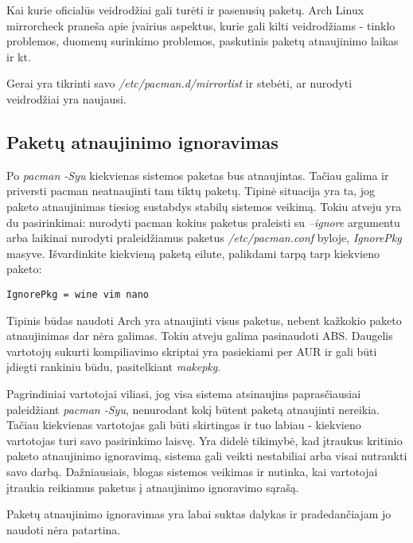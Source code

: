       Kai kurie oficialūs veidrodžiai gali turėti ir pasenusių
      paketų. Arch Linux mirrorcheck praneša apie įvairius aspektus,
      kurie gali kilti veidrodžiams - tinklo problemos, duomenų
      surinkimo problemos, paskutinis paketų atnaujinimo laikas ir kt.

      Gerai yra tikrinti savo \textsl{/etc/pacman.d/mirrorlist} ir
      stebėti, ar nurodyti veidrodžiai yra naujausi. 

    \subsection{Paketų atnaujinimo ignoravimas}

      Po \textsl{pacman -Syu} kiekvienas sistemos paketas bus
      atnaujintas. Tačiau galima ir priversti pacman neatnaujinti tam
      tiktų paketų. Tipinė situacija yra ta, jog paketo atnaujinimas
      tiesiog sustabdys stabilų sistemos veikimą. Tokiu atveju yra du
      pasirinkimai: nurodyti pacman kokius paketus praleisti su
      \textsl{--ignore} argumentu arba laikinai nurodyti praleidžiamus
      paketus \textsl{/etc/pacman.conf} byloje, \textsl{IgnorePkg}
      masyve. Išvardinkite kiekvieną paketą eilute, palikdami tarpą
      tarp kiekvieno paketo:

      \begin{verbatim}
IgnorePkg = wine vim nano
      \end{verbatim}

      Tipinis būdas naudoti Arch yra atnaujinti visus paketus, nebent
      kažkokio paketo atnaujinimas dar nėra galimas. Tokiu atveju
      galima pasinaudoti ABS. Daugelis vartotojų sukurti kompiliavimo
      skriptai yra pasiekiami per AUR ir gali būti įdiegti rankiniu
      būdu, pasitelkiant \textsl{makepkg}.

      Pagrindiniai vartotojai viliasi, jog visa sistema atsinaujins
      paprasčiausiai paleidžiant \textsl{pacman -Syu}, nenurodant kokį
      būtent paketą atnaujinti nereikia. Tačiau kiekvienas vartotojas
      gali būti skirtingas ir tuo labiau - kiekvieno vartotojas turi
      savo pasirinkimo laisvę. Yra didelė tikimybė, kad įtraukus
      kritinio paketo atnaujinimo ignoravimą, sistema gali veikti
      nestabiliai arba visai nutraukti savo darbą. Dažniausiais,
      blogas sistemos veikimas ir nutinka, kai vartotojai įtraukia
      reikiamus paketus į atnaujinimo ignoravimo sąrašą. 

      Paketų atnaujinimo ignoravimas yra labai suktas dalykas ir
      pradedančiajam jo naudoti nėra patartina. 

